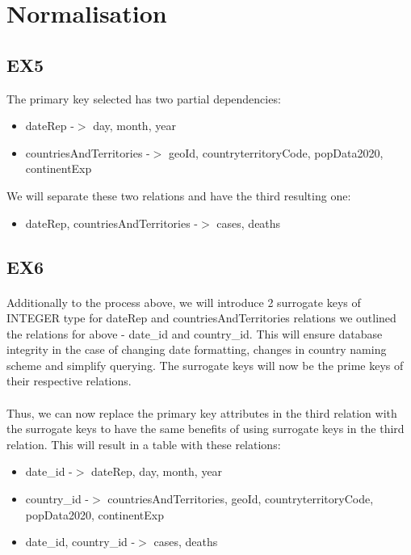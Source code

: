 \documentclass[12pt,oneside,a4paper,english]{article}
\begin{document}
\section{Normalisation}
\subsection{EX5}
\noindent The primary key selected has two partial dependencies:
\begin{itemize}
 \item { dateRep -$>$ day, month, year}
 \item { countriesAndTerritories -$>$ geoId, countryterritoryCode, popData2020, continentExp}
\end{itemize}

\noindent We will separate these two relations and have the third resulting one:
\begin{itemize}
 \item { dateRep, countriesAndTerritories -$>$ cases, deaths}
\end{itemize}

\pagebreak
\subsection{EX6}
\raggedright
\paragraph{} Additionally to the process above, we will introduce 2 surrogate keys of INTEGER type for dateRep and countriesAndTerritories relations we outlined the relations for above - date\_id and country\_id. This will ensure database integrity in the case of changing date formatting, changes in country naming scheme and simplify querying. The surrogate keys will now be the prime keys of their respective relations.
\paragraph{}Thus, we can now replace the primary key attributes in the third relation with the surrogate keys to have the same benefits of using surrogate keys in the third relation. This will result in a table with these relations:
\begin{itemize}
 \item { date\_id -$>$ dateRep, day, month, year}
 \item { country\_id -$>$ countriesAndTerritories, geoId, countryterritoryCode, popData2020, continentExp}
 \item { date\_id, country\_id -$>$ cases, deaths}
\end{itemize}
\end{document}
